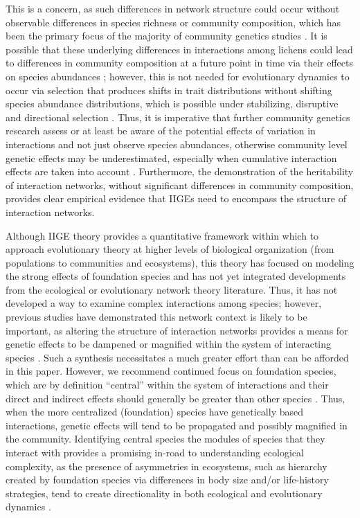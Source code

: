 \documentclass[fleqn,12pt]{olplainarticle}
\begin{document}
This is a concern, as such differences in network structure could
occur without observable differences in species richness or community
composition, which has been the primary focus of the majority of
community genetics studies
\citep{Whitham2020IntraspecificEvolution}. It is possible that these
underlying differences in interactions among lichens could lead to
differences in community composition at a future point in time via
their effects on species abundances
\citep{Shuster2006COMMUNITYSTRUCTURE-fix}; however, this is not needed
for evolutionary dynamics to occur via selection that produces shifts
in trait distributions without shifting species abundance
distributions, which is possible under stabilizing, disruptive and
directional selection \citep{Conner2004ATextbook}. Thus, it is
imperative that further community genetics research assess or at least
be aware of the potential effects of variation in interactions and not
just observe species abundances, otherwise community level genetic
effects may be underestimated, especially when cumulative interaction
effects are taken into account
\citep{Borrett2007FunctionalProliferation, Borrett2010}. Furthermore,
the demonstration of the heritability of interaction networks, without
significant differences in community composition, provides clear
empirical evidence that IIGEs need to encompass the structure of
interaction networks.

Although IIGE theory provides a quantitative framework within which to
approach evolutionary theory at higher levels of biological
organization (from populations to communities and ecosystems), this
theory has focused on modeling the strong effects of foundation
species \citep{Shuster2006COMMUNITYSTRUCTURE-fix, Whitham2012afix,
  Whitham2020IntraspecificEvolution} and has not yet integrated
developments from the ecological or evolutionary network theory
literature. Thus, it has not developed a way to examine complex
interactions among species; however, previous studies have
demonstrated this network context is likely to be important, as
altering the structure of interaction networks provides a means for
genetic effects to be dampened or magnified within the system of
interacting species \citep{Smith2011, Keith2017}. Such a synthesis
necessitates a much greater effort than can be afforded in this paper.
However, we recommend continued focus on foundation species, which are
by definition ``central'' within the system of interactions and their
direct and indirect effects should generally be greater than other
species \citep{Ellison2005}. Thus, when the more centralized
(foundation) species have genetically based interactions, genetic
effects will tend to be propagated and possibly magnified in the
community. Identifying central species the modules of species that
they interact with provides a promising in-road to understanding
ecological complexity, as the presence of asymmetries in ecosystems,
such as hierarchy created by foundation species via differences in
body size and/or life-history strategies, tend to create
directionality in both ecological and evolutionary dynamics
\citep{Ellison2005, Bascompte2006, Whitham2020IntraspecificEvolution,
  Guimaraes2020afix}.
\end{document}
